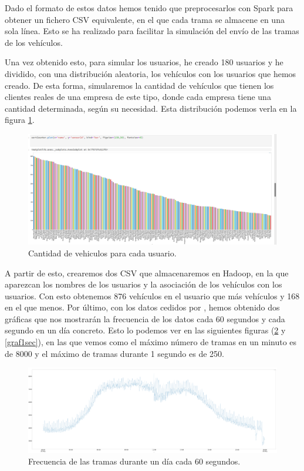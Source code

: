 Dado el formato de estos datos hemos tenido que preprocesarlos con Spark
para obtener un fichero CSV equivalente, en el que cada trama se almacene
en una sola línea. Esto se ha realizado para facilitar la simulación del
envío de las tramas de los vehículos.

Una vez obtenido esto, para simular los usuarios, he creado 180 usuarios y
he dividido, con una distribución aleatoria, los vehículos con los usuarios
que hemos creado. De esta forma, simularemos la cantidad de vehículos que
tienen los clientes reales de una empresa de este tipo, donde cada empresa
tiene una cantidad determinada, según su necesidad. Esta distribución
podemos verla en la figura \ref{userGraf}.

\begin{figure}[htp]
\centering
\includegraphics[scale=0.3]{Imagenes/graf1.png}
\caption{Cantidad de vehiculos para cada usuario.}
\label{userGraf}
\end{figure}

A partir de esto, crearemos dos CSV que almacenaremos en Hadoop, en la que
aparezcan los nombres de los usuarios y la asociación de los vehículos con
los usuarios. Con esto obtenemos 876 vehículos en el usuario que más
vehículos y 168 en el que menos. Por último, con los datos cedidos por
\mdata{}, hemos obtenido dos gráficas que nos mostrarán la frecuencia de
los datos cada 60 segundos y cada segundo en un día concreto. Esto lo
podemos ver en las siguientes figuras (\ref{graf60sec} y \ref{graf1sec}),
en las que vemos como el máximo número de tramas en un minuto es de 8000 y
el máximo de tramas durante 1 segundo es de 250.

\begin{figure}[htp]
\centering
\includegraphics[scale=0.26]{Imagenes/graf2.png}
\caption{Frecuencia de las tramas durante un día cada 60 segundos.}
\label{graf60sec}
\end{figure}


